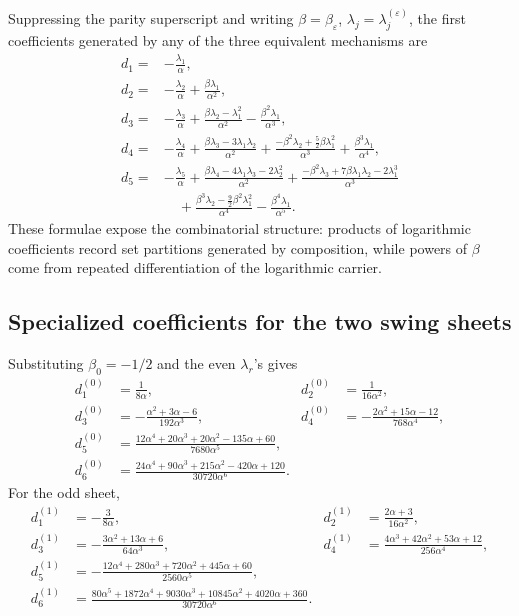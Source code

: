 \documentclass[11pt,a4paper]{article}
\theoremstyle{clean}
\theoremstyle{definition}
\newcommand{\eps}{\varepsilon}
\newcommand{\al}{\alpha}
\newcommand{\be}{\beta}
\begin{document}
Suppressing the parity superscript and writing \(\be=\be_\eps\), \(\lambda_j=\lambda_j^{(\eps)}\), the first coefficients generated by any of the three equivalent mechanisms are
\begin{align}
 d_1={}&-\frac{\lambda_1}{\al},
 \label{eq:d1-general}\\
 d_2={}&-\frac{\lambda_2}{\al}+\frac{\be\lambda_1}{\al^2},
 \label{eq:d2-general}\\
 d_3={}&-\frac{\lambda_3}{\al}
 +\frac{\be\lambda_2-\lambda_1^2}{\al^2}
 -\frac{\be^2\lambda_1}{\al^3},
 \label{eq:d3-general}\\
 d_4={}&-\frac{\lambda_4}{\al}
 +\frac{\be\lambda_3-3\lambda_1\lambda_2}{\al^2}
 +\frac{-\be^2\lambda_2+\tfrac52\be\lambda_1^2}{\al^3}
 +\frac{\be^3\lambda_1}{\al^4},
 \label{eq:d4-general}\\
 d_5={}&-\frac{\lambda_5}{\al}
 +\frac{\be\lambda_4-4\lambda_1\lambda_3-2\lambda_2^2}{\al^2}
 +\frac{-\be^2\lambda_3+7\be\lambda_1\lambda_2-2\lambda_1^3}{\al^3}
 \nonumber\\
 &\quad+\frac{\be^3\lambda_2-\tfrac92\be^2\lambda_1^2}{\al^4}
 -\frac{\be^4\lambda_1}{\al^5}.
 \label{eq:d5-general}
\end{align}
These formulae expose the combinatorial structure: products of logarithmic coefficients record set partitions generated by composition, while powers of \(\be\) come from repeated differentiation of the logarithmic carrier.

\subsection{Specialized coefficients for the two swing sheets}

Substituting \(\be_0=-1/2\) and the even \(\lambda_r\)'s gives
\begin{align}
 d_1^{(0)}&=\frac{1}{8\al},
 &d_2^{(0)}&=\frac{1}{16\al^2},
 \label{eq:d-even-12}\\
 d_3^{(0)}&=-\frac{\al^2+3\al-6}{192\al^3},
 &d_4^{(0)}&=-\frac{2\al^2+15\al-12}{768\al^4},
 \label{eq:d-even-34}\\
 d_5^{(0)}&=\frac{12\al^4+20\al^3+20\al^2-135\al+60}{7680\al^5},
 \label{eq:d-even-5}\\
 d_6^{(0)}&=\frac{24\al^4+90\al^3+215\al^2-420\al+120}{30720\al^6}.
 \label{eq:d-even-6}
\end{align}
For the odd sheet,
\begin{align}
 d_1^{(1)}&=-\frac{3}{8\al},
 &d_2^{(1)}&=\frac{2\al+3}{16\al^2},
 \label{eq:d-odd-12}\\
 d_3^{(1)}&=-\frac{3\al^2+13\al+6}{64\al^3},
 &d_4^{(1)}&=\frac{4\al^3+42\al^2+53\al+12}{256\al^4},
 \label{eq:d-odd-34}\\
 d_5^{(1)}&=-\frac{12\al^4+280\al^3+720\al^2+445\al+60}{2560\al^5},
 \label{eq:d-odd-5}\\
 d_6^{(1)}&=\frac{80\al^5+1872\al^4+9030\al^3+10845\al^2+4020\al+360}{30720\al^6}.
 \label{eq:d-odd-6}
\end{align}
\end{document}
